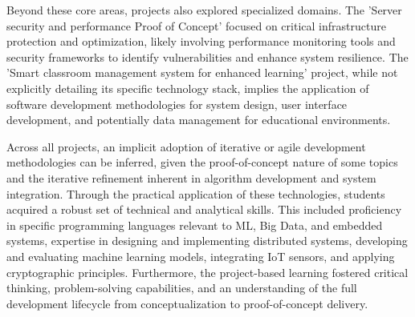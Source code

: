 \documentclass[11pt,a4paper]{article}
\newenvironment{card}{
    \begin{tcolorbox}[
        enhanced,
        colback=cardback,
        colframe=border,
        sharp corners,
        boxrule=0.5pt,
        drop shadow,
        drop shadow={shadow xshift=1mm,shadow yshift=-1mm,fill=border!50},
        boxsep=3mm,
        left=5mm, right=5mm, top=5mm, bottom=5mm,
        width=\textwidth,
        nobeforeafter
    ]
}{\end{tcolorbox}}
\begin{document}
\begin{card}
    Beyond these core areas, projects also explored specialized domains. The 'Server security and performance Proof of Concept' focused on critical infrastructure protection and optimization, likely involving performance monitoring tools and security frameworks to identify vulnerabilities and enhance system resilience. The 'Smart classroom management system for enhanced learning' project, while not explicitly detailing its specific technology stack, implies the application of software development methodologies for system design, user interface development, and potentially data management for educational environments.

    Across all projects, an implicit adoption of iterative or agile development methodologies can be inferred, given the proof-of-concept nature of some topics and the iterative refinement inherent in algorithm development and system integration. Through the practical application of these technologies, students acquired a robust set of technical and analytical skills. This included proficiency in specific programming languages relevant to ML, Big Data, and embedded systems, expertise in designing and implementing distributed systems, developing and evaluating machine learning models, integrating IoT sensors, and applying cryptographic principles. Furthermore, the project-based learning fostered critical thinking, problem-solving capabilities, and an understanding of the full development lifecycle from conceptualization to proof-of-concept delivery.
\end{card}

\vspace{0.5cm}
\end{document}
